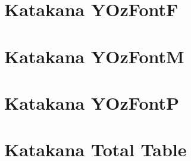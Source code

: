 \JapaneseDefault
\newpage\JapaneseYOzFontF\section{Katakana YOzFontF}
\JapaneseDefault
\newpage\JapaneseYOzFontM\section{Katakana YOzFontM}
\JapaneseDefault
\newpage\JapaneseYOzFontP\section{Katakana YOzFontP}
\JapaneseDefault
\newpage\section{Katakana Total Table} 
